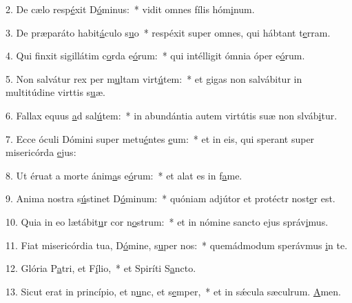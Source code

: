 2. De cælo resp\uline{é}xit D\uline{ó}minus:~* vidit omnes fílis hóm\uline{i}num.\par 
3. De præparáto habit\uline{á}culo s\uline{u}o~* respéxit super omnes, qui hábtant t\uline{e}rram.\par 
4. Qui finxit sigillátim c\uline{o}rda e\uline{ó}rum:~* qui intélligit ómnia óper e\uline{ó}rum.\par 
5. Non salvátur rex per m\uline{u}ltam virt\uline{ú}tem:~* et gigas non salvábitur in multitúdine virttis s\uline{u}æ.\par 
6. Fallax equus \uline{a}d sal\uline{ú}tem:~* in abundántia autem virtútis suæ non slváb\uline{i}tur.\par 
7. Ecce óculi Dómini super metu\uline{é}ntes \uline{e}um:~* et in eis, qui sperant super misericórda \uline{e}jus:\par 
8. Ut éruat a morte ánim\uline{a}s e\uline{ó}rum:~* et alat es in f\uline{a}me.\par 
9. Anima nostra s\uline{ú}stinet D\uline{ó}minum:~* quóniam adjútor et protéctr nost\uline{e}r est.\par 
10. Quia in eo lætábit\uline{u}r cor n\uline{o}strum:~* et in nómine sancto ejus správ\uline{i}mus.\par 
11. Fiat misericórdia tua, D\uline{ó}mine, s\uline{u}per nos:~* quemádmodum sperávmus \uline{i}n te.\par 
12. Glória P\uline{a}tri, et F\uline{í}lio,~* et Spiríti S\uline{a}ncto.\par 
13. Sicut erat in princípio, et n\uline{u}nc, et s\uline{e}mper,~* et in sǽcula sæculrum. \uline{A}men.\par 
